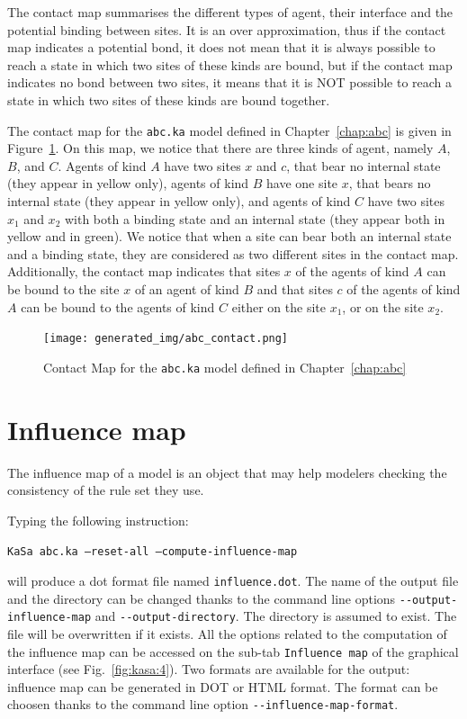 \documentclass[11pt]{book}
\def\ttt#1{\texttt{#1}}
\begin{document}
The contact map summarises the different types of agent, their interface and the potential binding between sites. It is an over approximation, thus if the contact map indicates a potential bond, it does not mean that it is always possible to reach a state in which two sites of these kinds are bound, but if the contact map indicates no bond between two sites, it means that it is NOT possible to reach a state in which two sites of these kinds are bound together.


The contact map for the \ttt{abc.ka} model  defined in Chapter~\ref{chap:abc} is given in Figure~\ref{fig:abc-contact}. On this map, we notice that there are three kinds of agent, namely $A$, $B$, and $C$.
Agents of kind $A$ have two sites $x$ and $c$, that bear no internal state (they appear in yellow only), agents of kind $B$ have one site $x$, that bears no internal state (they appear in yellow only), and agents of kind $C$ have two sites $x_1$ and $x_2$ with both a binding state and an internal state (they appear both in yellow and in green). We notice that when a site can bear both an internal state and a binding state, they are considered as two different sites in the contact map. Additionally, the contact map indicates that sites $x$ of the agents of kind $A$ can be bound to the site $x$ of an agent of kind $B$ and that sites $c$ of the agents of kind $A$ can be bound to the agents of kind $C$ either on the site $x_1$, or on the site $x_2$.

\begin{figure}[htbp]
\centering
\texttt{[image: generated\_img/abc\_contact.png]}
\caption{Contact Map for the \ttt{abc.ka} model defined in Chapter~\ref{chap:abc}}
\label{fig:abc-contact}
\end{figure}



\section{Influence map}

The influence map of a model is an object that may help modelers checking the consistency of the rule set they use.

Typing the following instruction:

\texttt{KaSa abc.ka --reset-all --compute-influence-map}

will produce a dot format file named \texttt{influence.dot}.
The name of the output file and the directory can be changed thanks to the command line options \texttt{-{}-output-influence-map} and \texttt{-{}-output-directory}.
The directory is assumed to exist. The file will be overwritten if it exists.  All the options related to the computation of the influence map can be accessed on the sub-tab \texttt{Influence map} of the graphical interface (see Fig.~\ref{fig:kasa:4}). Two formats are available for the output: influence map can be generated in DOT or HTML format. The format can be choosen thanks to the command line option \texttt{-{}-influence-map-format}.
\end{document}
